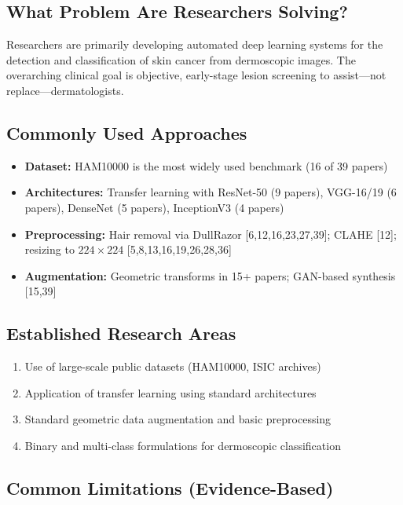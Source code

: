 \documentclass[11pt,a4paper]{article}
\begin{document}
\subsection{What Problem Are Researchers Solving?}
Researchers are primarily developing automated deep learning systems for the detection and classification of skin cancer from dermoscopic images. The overarching clinical goal is objective, early-stage lesion screening to assist---not replace---dermatologists.

\subsection{Commonly Used Approaches}

\begin{itemize}[leftmargin=*,itemsep=2pt]
\item \textbf{Dataset:} HAM10000 is the most widely used benchmark (16 of 39 papers)
\item \textbf{Architectures:} Transfer learning with ResNet-50 (9 papers), VGG-16/19 (6 papers), DenseNet (5 papers), InceptionV3 (4 papers)
\item \textbf{Preprocessing:} Hair removal via DullRazor [6,12,16,23,27,39]; CLAHE [12]; resizing to $224\times224$ [5,8,13,16,19,26,28,36]
\item \textbf{Augmentation:} Geometric transforms in 15+ papers; GAN-based synthesis [15,39]
\end{itemize}

\subsection{Established Research Areas}
\begin{enumerate}[leftmargin=*,itemsep=2pt]
\item Use of large-scale public datasets (HAM10000, ISIC archives)
\item Application of transfer learning using standard architectures
\item Standard geometric data augmentation and basic preprocessing
\item Binary and multi-class formulations for dermoscopic classification
\end{enumerate}

\subsection{Common Limitations (Evidence-Based)}
\end{document}
